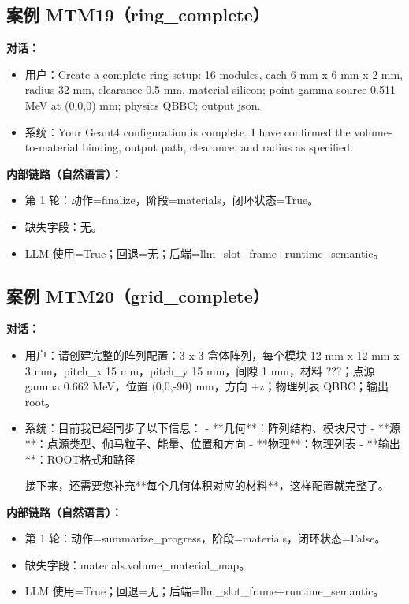\documentclass[11pt]{ctexart}
\begin{document}
\subsection{案例 MTM19（ring\_complete）}
\textbf{对话：}
\begin{itemize}
\item 用户：Create a complete ring setup: 16 modules, each 6 mm x 6 mm x 2 mm, radius 32 mm, clearance 0.5 mm, material silicon; point gamma source 0.511 MeV at (0,0,0) mm; physics QBBC; output json.
\item 系统：Your Geant4 configuration is complete. I have confirmed the volume-to-material binding, output path, clearance, and radius as specified.
\end{itemize}
\textbf{内部链路（自然语言）：}
\begin{itemize}
\item 第 1 轮：动作=finalize，阶段=materials，闭环状态=True。
\item 缺失字段：无。
\item LLM 使用=True；回退=无；后端=llm\_slot\_frame+runtime\_semantic。
\end{itemize}
\subsection{案例 MTM20（grid\_complete）}
\textbf{对话：}
\begin{itemize}
\item 用户：请创建完整的阵列配置：3 x 3 盒体阵列，每个模块 12 mm x 12 mm x 3 mm，pitch\_x 15 mm，pitch\_y 15 mm，间隙 1 mm，材料 ???；点源 gamma 0.662 MeV，位置 (0,0,-90) mm，方向 +z；物理列表 QBBC；输出 root。
\item 系统：目前我已经同步了以下信息：
- **几何**：阵列结构、模块尺寸
- **源**：点源类型、伽马粒子、能量、位置和方向
- **物理**：物理列表
- **输出**：ROOT格式和路径

接下来，还需要您补充**每个几何体积对应的材料**，这样配置就完整了。
\end{itemize}
\textbf{内部链路（自然语言）：}
\begin{itemize}
\item 第 1 轮：动作=summarize\_progress，阶段=materials，闭环状态=False。
\item 缺失字段：materials.volume\_material\_map。
\item LLM 使用=True；回退=无；后端=llm\_slot\_frame+runtime\_semantic。
\end{itemize}
\end{document}
